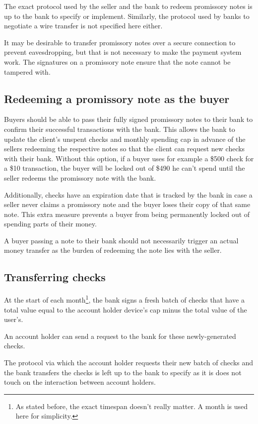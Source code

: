 \documentclass[12pt,a4paper]{article}
\begin{document}
\begin{multicols}{2}
	The exact protocol used by the seller and the bank to redeem promissory notes is up to the bank to specify or implement. Similarly, the protocol used by banks to negotiate a wire transfer is not specified here either.

	It may be desirable to transfer promissory notes over a secure connection to prevent eavesdropping, but that is not necessary to make the payment system work. The signatures on a promissory note ensure that the note cannot be tampered with.
	
	\subsection{Redeeming a promissory note as the buyer}
	
	Buyers should be able to pass their fully signed promissory notes to their bank to confirm their successful transactions with the bank. This allows the bank to update the client's unspent checks and monthly spending cap in advance of the sellers redeeming the respective notes so that the client can request new checks with their bank. Without this option, if a buyer uses for example a \$500 check for a \$10 transaction, the buyer will be locked out of \$490 he can't spend until the seller redeems the promissory note with the bank.
	
	Additionally, checks have an expiration date that is tracked by the bank in case a seller never claims a promissory note and the buyer loses their copy of that same note. This extra measure prevents a buyer from being permanently locked out of spending parts of their money.
	
	A buyer passing a note to their bank should not necessarily trigger an actual money transfer as the burden of redeeming the note lies with the seller.

	\subsection{Transferring checks}

	At the start of each month\footnote{As stated before, the exact timespan doesn't really matter. A month is used here for simplicity.}, the bank signs a fresh batch of checks that have a total value equal to the account holder device's cap minus the total value of the user's.

	An account holder can send a request to the bank for these newly-generated checks.

	The protocol via which the account holder requests their new batch of checks and the bank transfers the checks is left up to the bank to specify as it is does not touch on the interaction between account holders.
	

\end{multicols}
\end{document}
